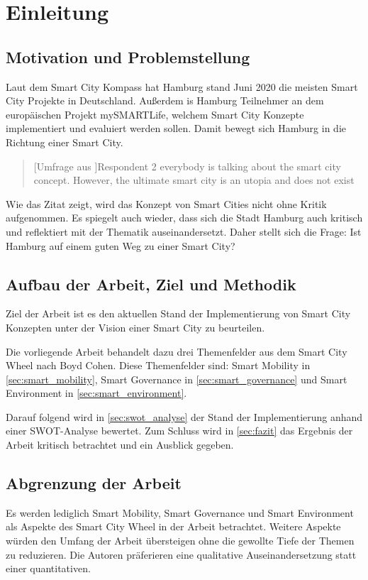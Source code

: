 \section{Einleitung}

\subsection{Motivation und Problemstellung}
Laut dem Smart City Kompass hat Hamburg stand Juni 2020 die meisten Smart City Projekte in Deutschland. %
Außerdem is Hamburg Teilnehmer an dem europäischen Projekt mySMARTLife, welchem Smart City Konzepte implementiert und evaluiert werden sollen. %
Damit bewegt sich Hamburg in die Richtung einer Smart City.

\begin{quote}[Umfrage aus \autocite[S. 126]{Spil.2017}]{Respondent 2}
	\glqq everybody is talking about the smart city concept. However, the ultimate smart city is an utopia and does not exist\grqq
\end{quote}

Wie das Zitat zeigt, wird das Konzept von Smart Cities nicht ohne Kritik aufgenommen.
Es spiegelt auch wieder, dass sich die Stadt Hamburg auch kritisch und reflektiert mit der Thematik auseinandersetzt.
Daher stellt sich die Frage: Ist Hamburg auf einem guten Weg zu einer Smart City?

\subsection{Aufbau der Arbeit, Ziel und Methodik}
Ziel der Arbeit ist es den aktuellen Stand der Implementierung von Smart City Konzepten unter der Vision einer Smart City zu beurteilen.

Die vorliegende Arbeit behandelt dazu drei Themenfelder aus dem Smart City Wheel nach Boyd Cohen.
Diese Themenfelder sind: Smart Mobility in \autoref{sec:smart_mobility}, Smart Governance in \autoref{sec:smart_governance} und Smart Environment in \autoref{sec:smart_environment}.

Darauf folgend wird in \autoref{sec:swot_analyse} der Stand der Implementierung anhand einer SWOT-Analyse bewertet.
Zum Schluss wird in \autoref{sec:fazit} das Ergebnis der Arbeit kritisch betrachtet und ein Ausblick gegeben.

\subsection{Abgrenzung der Arbeit}
Es werden lediglich Smart Mobility, Smart Governance und Smart Environment als Aspekte des Smart City Wheel in der Arbeit betrachtet.
Weitere Aspekte würden den Umfang der Arbeit übersteigen ohne die gewollte Tiefe der Themen zu reduzieren.
Die Autoren präferieren eine qualitative Auseinandersetzung statt einer quantitativen.